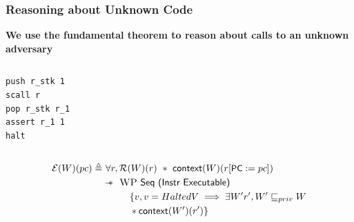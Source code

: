 \documentclass{beamer}
\newcommand{\sep}{-\kern-.6em\raisebox{-.659ex}{*}\ }
\newcommand{\interp}[2]{(#1)(#2)}
\begin{document}
\begin{frame}[fragile]
\frametitle{Reasoning about Unknown Code}
\textbf{We use the fundamental theorem to reason about calls to an unknown adversary}

\begin{columns}[c]


\begin{center}
\begin{lstlisting}
push r_stk 1
scall r 
pop r_stk r_1
assert r_1 1
halt
\end{lstlisting}
\end{center}

\end{columns}

\begin{align*}
 		\mathcal{E}\interp{W}{pc} \triangleq&~\forall r, \mathcal{R}(W)(r) ~*~{\textsf{context}(W)(r[\textsf{\small PC}:=pc])}\\
 		&\sep~\textsc{WP}~\textsf{Seq (Instr Executable)}~\\
 		&\hspace{1cm}\{ v, v = HaltedV \implies \exists W' r', W' \sqsubseteq_{priv} W \\
 		&\hspace{1cm}* {\textsf{context}(W')(r')}\}
 	\end{align*}

\end{frame}
\end{document}
